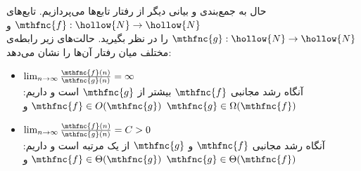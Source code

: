 
حال به جمع‌بندی و بیانی دیگر از رفتار تابع‌ها می‌پردازیم. تابع‌های 
$\mthfnc{f} : \hollow{N} \rightarrow \hollow{N}$ 
و 
$\mthfnc{g} : \hollow{N} \rightarrow \hollow{N}$ 
را در نظر بگیرید. حالت‌های زیر رابطه‌ی مختلف میان رفتار آن‌ها را نشان می‌دهد:
\begin{itemize}
\item $\lim_{n\rightarrow \infty} \frac{ \mthfnc{f}(n) }{ \mthfnc{g}(n) } = \infty$\\
آنگاه رشد مجانبی 
$\mthfnc{f}$ 
بیشتر از 
$\mthfnc{g}$ 
است و داریم: 
$\mthfnc{f} \in O( \mthfnc{g} )$ 
و 
$\mthfnc{g} \in \Omega ( \mthfnc{f} ) $

\item $\lim_{n\rightarrow \infty} \frac{ \mthfnc{f}(n) }{ \mthfnc{g}(n) } = C > 0$\\
آنگاه رشد مجانبی 
$\mthfnc{f}$ 
و 
$\mthfnc{g}$ 
از یک مرتبه است و داریم: 
$\mthfnc{f} \in \Theta( \mthfnc{g} )$ 
و 
$\mthfnc{g} \in \Theta( \mthfnc{f} )$


\end{itemize}